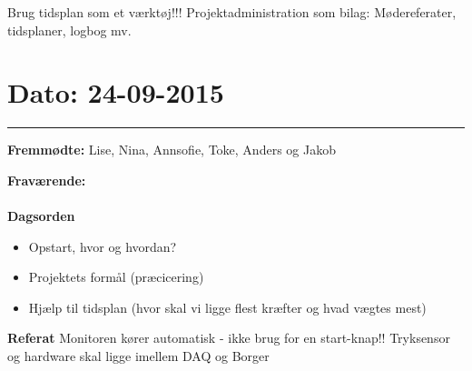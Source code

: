 Brug tidsplan som et værktøj!!! 
Projektadministration som bilag: Mødereferater, tidsplaner, logbog mv. 



\section{Dato: 24-09-2015}
\hrule

\textbf{Fremmødte:} Lise, Nina, Annsofie, Toke, Anders og Jakob

\textbf{Fraværende:} 
\\
\\
\textbf{Dagsorden}
\begin{itemize}
	\item Opstart, hvor og hvordan?
	\item Projektets formål (præcicering)
	\item Hjælp til tidsplan (hvor skal vi ligge flest kræfter og hvad vægtes mest)
\end{itemize}

\textbf{Referat}
Monitoren kører automatisk - ikke brug for en start-knap!!
Tryksensor og hardware skal ligge imellem DAQ og Borger
